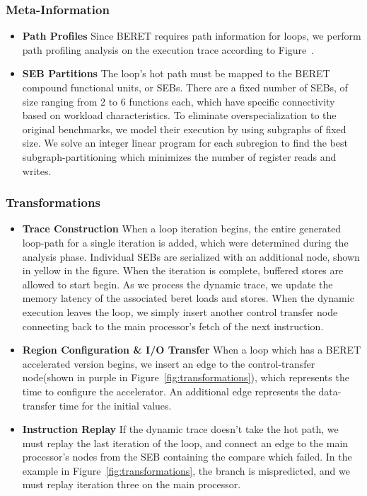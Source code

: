 \subsubsection*{Meta-Information}
\begin{itemize}
  \item \textbf{Path Profiles}
  Since BERET requires path information for loops, we perform path profiling analysis on 
the execution trace according to Figure~\cite{path-profiling}.  
  \item \textbf{SEB Partitions}
  The loop's hot path must be mapped to the BERET compound functional units, or SEBs.  
  There are a fixed number of SEBs, of size ranging from 2 to 6 functions each, which
have specific connectivity based on workload characteristics.  To eliminate overspecialization
to the original benchmarks, we model their execution by using subgraphs of fixed size. 
We solve an integer linear program for each subregion to find the best subgraph-partitioning 
which minimizes the number of register reads and writes.
\end{itemize}

\subsubsection*{Transformations}
\begin{itemize}
  \item \textbf{Trace Construction}
  When a loop iteration begins, the entire generated loop-path for a single iteration is added,
which were determined during the analysis phase.  Individual SEBs are serialized
with an additional node, shown in yellow in the figure.  When the iteration is complete,
buffered stores are allowed to start begin.  As we process the dynamic trace, we
update the memory latency of the associated beret loads and stores.  When the
dynamic execution leaves the loop, we simply insert another control transfer node
connecting back to the main processor's fetch of the next instruction. 
  \item \textbf{Region Configuration \& I/O Transfer}
  When a loop which has a BERET 
accelerated version begins, we insert an edge to the control-transfer 
node(shown in purple in Figure~\ref{fig:transformations}), which represents 
the time to configure the accelerator. An additional
edge represents the data-transfer time for the initial values. 
  \item \textbf{Instruction Replay}
  If the dynamic trace doesn't take the hot path, we must replay the last iteration of the loop, and connect
an edge to the main processor's nodes from the SEB containing the compare which failed.
In the example in Figure~\ref{fig:transformations}, the branch is mispredicted, and 
we must replay iteration three on the main processor.
\end{itemize}


